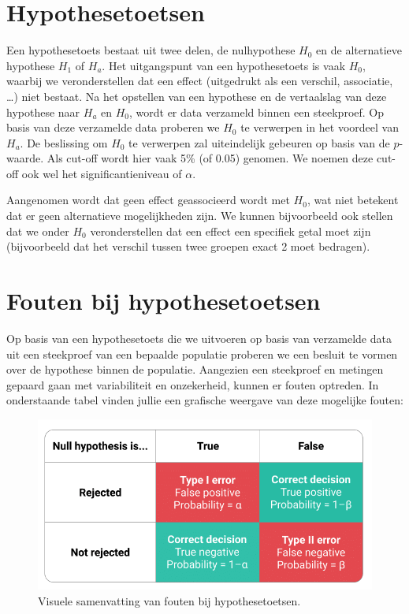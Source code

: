 \documentclass[
]{book}
\theoremstyle{definition}
\theoremstyle{definition}
\theoremstyle{definition}
\theoremstyle{definition}
\theoremstyle{remark}
\begin{document}
\hypertarget{hypothesetoetsen}{%
\section*{Hypothesetoetsen}\label{hypothesetoetsen}}


Een hypothesetoets bestaat uit twee delen, de nulhypothese \(H_0\) en de alternatieve hypothese \(H_1\) of \(H_a\). Het uitgangspunt van een hypothesetoets is vaak \(H_0\), waarbij we veronderstellen dat een effect (uitgedrukt als een verschil, associatie, \ldots) niet bestaat. Na het opstellen van een hypothese en de vertaalslag van deze hypothese naar \(H_a\) en \(H_0\), wordt er data verzameld binnen een steekproef. Op basis van deze verzamelde data proberen we \(H_0\) te verwerpen in het voordeel van \(H_a\). De beslissing om \(H_0\) te verwerpen zal uiteindelijk gebeuren op basis van de \(p\)-waarde. Als cut-off wordt hier vaak 5\% (of 0.05) genomen. We noemen deze cut-off ook wel het significantieniveau of \(\alpha\).

Aangenomen wordt dat geen effect geassocieerd wordt met \(H_0\), wat niet betekent dat er geen alternatieve mogelijkheden zijn. We kunnen bijvoorbeeld ook stellen dat we onder \(H_0\) veronderstellen dat een effect een specifiek getal moet zijn (bijvoorbeeld dat het verschil tussen twee groepen exact 2 moet bedragen).

\hypertarget{fouten-bij-hypothesetoetsen}{%
\section*{Fouten bij hypothesetoetsen}\label{fouten-bij-hypothesetoetsen}}


Op basis van een hypothesetoets die we uitvoeren op basis van verzamelde data uit een steekproef van een bepaalde populatie proberen we een besluit te vormen over de hypothese binnen de populatie. Aangezien een steekproef en metingen gepaard gaan met variabiliteit en onzekerheid, kunnen er fouten optreden. In onderstaande tabel vinden jullie een grafische weergave van deze mogelijke fouten:

\begin{figure}
\includegraphics[width=0.9\linewidth]{img/error} \caption{Visuele samenvatting van fouten bij hypothesetoetsen.}\label{fig:error}
\end{figure}
\end{document}
